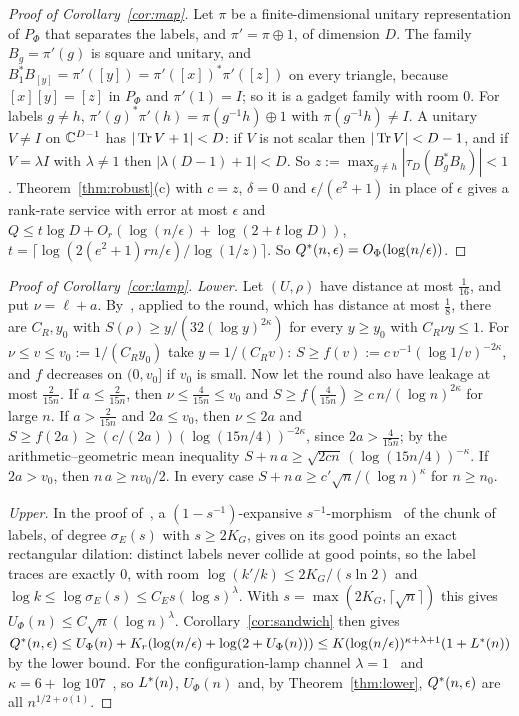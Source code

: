 \begin{proof}[Proof of Corollary~\ref{cor:map}]
Let $\pi$ be a finite-dimensional unitary representation of $P_\Phi$ that separates the labels, and $\pi'=\pi\oplus1$, of dimension $D$. The family
$B_g=\pi'(g)$ is square and unitary, and $B_1^*B_{[y]}=\pi'([y])=\pi'([x])^*\pi'([z])$ on every triangle, because $[x][y]=[z]$ in $P_\Phi$ and $\pi'(1)=I$; so it
is a gadget family with room $0$. For labels $g\ne h$, $\pi'(g)^*\pi'(h)=\pi(g^{-1}h)\oplus1$ with $\pi(g^{-1}h)\ne I$. A unitary $V\ne I$ on $\mathbb C^{D-1}$ has
$|\operatorname{Tr} V+1|<D$: if $V$ is not scalar then $|\operatorname{Tr} V|<D-1$, and if $V=\lambda I$ with $\lambda\ne1$ then $|\lambda(D-1)+1|<D$. So
$z:=\max_{g\ne h}|\tau_D(B_g^*B_h)|<1$. Theorem~\ref{thm:robust}(c) with $c=z$, $\delta=0$ and $\epsilon/(e^2+1)$ in place of $\epsilon$ gives a rank-rate service
with error at most $\epsilon$ and $Q\le t\log D+O_r(\log(n/\epsilon)+\log(2+t\log D))$, $t=\lceil\log(2(e^2+1)rn/\epsilon)/\log(1/z)\rceil$. So
$Q^{*}(n,\epsilon)=O_\Phi(\log(n/\epsilon))$.
\end{proof}

\begin{proof}[Proof of Corollary~\ref{cor:lamp}]
\emph{Lower.} Let $(U,\rho)$ have distance at most $\frac1{16}$, and put $\nu=\ell+a$. By~\cite[Corollary~10.2(a)]{DouglasMghirbiC}, applied to the round, which
has distance at most $\frac18$, there are $C_R,y_0$ with $S(\rho)\ge y/(32(\log y)^{2\kappa})$ for every $y\ge y_0$ with $C_R\nu y\le1$. For $\nu\le v\le v_0:=1/(C_Ry_0)$
take $y=1/(C_Rv)$: $S\ge f(v):=c\,v^{-1}(\log1/v)^{-2\kappa}$, and $f$ decreases on $(0,v_0]$ if $v_0$ is small. Now let the round also have leakage at most
$\frac2{15n}$. If $a\le\frac2{15n}$, then $\nu\le\frac4{15n}\le v_0$ and $S\ge f(\frac4{15n})\ge c\,n/(\log n)^{2\kappa}$ for large $n$. If $a>\frac2{15n}$ and $2a\le v_0$,
then $\nu\le2a$ and $S\ge f(2a)\ge(c/(2a))(\log(15n/4))^{-2\kappa}$, since $2a>\frac4{15n}$; by the arithmetic--geometric mean inequality
$S+n\,a\ge\sqrt{2cn}\,(\log(15n/4))^{-\kappa}$. If $2a>v_0$, then $n\,a\ge nv_0/2$. In every case $S+n\,a\ge c'\sqrt n/(\log n)^\kappa$ for $n\ge n_0$.

\emph{Upper.} In the proof of~\cite[Corollary~12.3]{DouglasMghirbiC}, a $(1-s^{-1})$-expansive $s^{-1}$-morphism~\cite[Definition~3.4]{Cornulier2013} of the chunk of labels, of degree
$\sigma_E(s)$ with $s\ge2K_G$, gives on its good points an exact rectangular dilation: distinct labels never collide at good points, so the label traces are
exactly $0$, with room $\log(k'/k)\le2K_G/(s\ln2)$ and $\log k\le\log\sigma_E(s)\le C_Es(\log s)^\lambda$. With $s=\max(2K_G,\lceil\sqrt n\rceil)$ this gives
$U_\Phi(n)\le C\sqrt n(\log n)^\lambda$. Corollary~\ref{cor:sandwich} then gives
$Q^{*}(n,\epsilon)\le U_\Phi(n)+K_r(\log(n/\epsilon)+\log(2+U_\Phi(n)))\le K(\log(n/\epsilon))^{\kappa+\lambda+1}(1+L^{*}(n))$ by the lower bound. For the configuration-lamp channel
$\lambda=1$~\cite[Theorem~3.3(b)]{DouglasMghirbiC} and $\kappa=6+\log107$~\cite[Section~11]{DouglasMghirbiC}, so $L^{*}(n)$, $U_\Phi(n)$ and, by
Theorem~\ref{thm:lower}, $Q^{*}(n,\epsilon)$ are all $n^{1/2+o(1)}$.
\end{proof}
